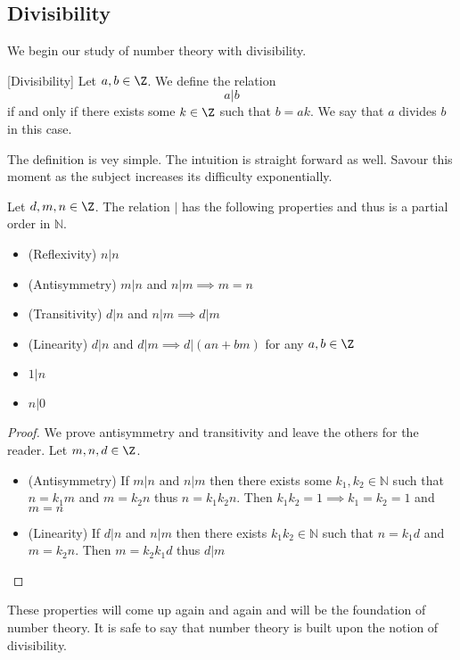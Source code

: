 \subsection{Divisibility}
We begin our study of number theory with divisibility. 
\begin{defn}{}{}[Divisibility] Let $a,b\in\Z$. We define the relation $$a|b$$ if and only if there exists some $k\in\Z$ such that $b=ak$. We say that $a$ divides $b$ in this case. 
\end{defn}
The definition is vey simple. The intuition is straight forward as well. Savour this moment as the subject increases its difficulty exponentially.  

\begin{prp}{}{} Let $d,m,n\in\Z$. The relation $|$ has the following properties and thus is a partial order in $\mathbb{N}$. 
\begin{itemize}
\item (Reflexivity) $n|n$
\item (Antisymmetry) $m|n$ and $n|m\implies m=n$
\item (Transitivity) $d|n$ and $n|m\implies d|m$
\item (Linearity) $d|n$ and $d|m\implies d|(an+bm)$ for any $a,b\in\Z$
\item $1|n$
\item $n|0$
\end{itemize}
\end{prp}
\begin{proof} We prove antisymmetry and transitivity and leave the others for the reader. Let $m,n,d\in\Z$. 
\begin{itemize}
\item (Antisymmetry) If $m|n$ and $n|m$ then there exists some $k_1,k_2\in\mathbb{N}$ such that $n=k_1m$ and $m=k_2n$ thus $n=k_1k_2n$. Then $k_1k_2=1\implies k_1=k_2=1$ and $m=n$
\item (Linearity) If $d|n$ and $n|m$ then there exists $k_1k_2\in\mathbb{N}$ such that $n=k_1d$ and $m=k_2n$. Then $m=k_2k_1d$ thus $d|m$
\end{itemize}
\end{proof}

These properties will come up again and again and will be the foundation of number theory. It is safe to say that number theory is built upon the notion of divisibility. 

